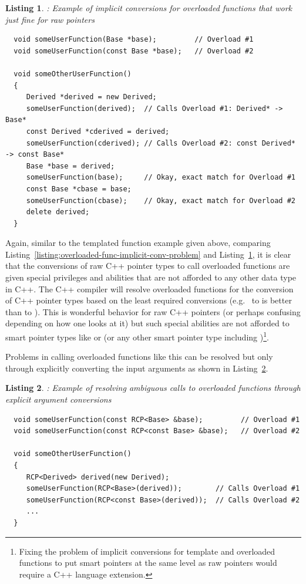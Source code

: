 \documentclass[pdf,ps2pdf,11pt]{SANDreport}
\newtheorem{listing}{Listing}
\begin{document}
{}\begin{listing}: Example of implicit conversions for overloaded
functions that work just fine for raw pointers
\label{listing:overloaded-func-implicit-conv-raw-pass}
{\small\begin{verbatim}
  void someUserFunction(Base *base);         // Overload #1
  void someUserFunction(const Base *base);   // Overload #2

  void someOtherUserFunction()
  {
     Derived *derived = new Derived;
     someUserFunction(derived);  // Calls Overload #1: Derived* -> Base*
     const Derived *cderived = derived;
     someUserFunction(cderived); // Calls Overload #2: const Derived* -> const Base*
     Base *base = derived;
     someUserFunction(base);     // Okay, exact match for Overload #1
     const Base *cbase = base;
     someUserFunction(cbase);    // Okay, exact match for Overload #2
     delete derived;
  }
\end{verbatim}}
\end{listing}


Again, similar to the templated function example given above,
comparing Listing~\ref{listing:overloaded-func-implicit-conv-problem}
and Listing~\ref{listing:overloaded-func-implicit-conv-raw-pass}, it
is clear that the conversions of raw C++ pointer types to call
overloaded functions are given special privileges and abilities that
are not afforded to any other data type in C++.  The C++ compiler will
resolve overloaded functions for the conversion of C++ pointer types
based on the least required conversions (e.g.\ {} to
{} is better than {} to {}).
This is wonderful behavior for raw C++ pointers (or perhaps confusing
depending on how one looks at it) but such special abilities are not
afforded to smart pointer types like {} or {} (or
any other smart pointer type including
{})\footnote{Fixing the problem of implicit
conversions for template and overloaded functions to put smart
pointers at the same level as raw pointers would require a C++
language extension.}.

Problems in calling overloaded functions like this can be resolved but
only through explicitly converting the input arguments as shown in
Listing~\ref{listing:overloaded-func-implicit-conv-explicit-pass}.


{}\begin{listing}: Example of resolving ambiguous calls to overloaded
functions through explicit argument conversions
\label{listing:overloaded-func-implicit-conv-explicit-pass}
{\small\begin{verbatim}
  void someUserFunction(const RCP<Base> &base);         // Overload #1
  void someUserFunction(const RCP<const Base> &base);   // Overload #2

  void someOtherUserFunction()
  {
     RCP<Derived> derived(new Derived);
     someUserFunction(RCP<Base>(derived));        // Calls Overload #1
     someUserFunction(RCP<const Base>(derived));  // Calls Overload #2
     ...
  }
\end{verbatim}}
\end{listing}
\end{document}
